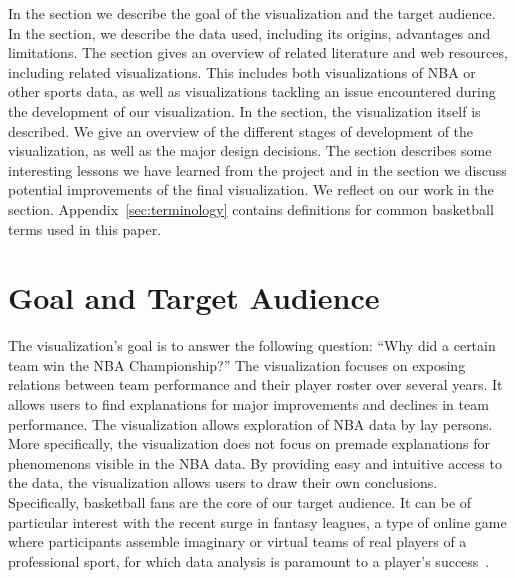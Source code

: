 \documentclass[]{sigchi}
\begin{document}
In the  section we describe the goal of the visualization and the
target audience. In the  section, we describe the data used, including its origins, advantages and limitations. The  section gives an overview of related literature and web resources, including related
visualizations. This includes both visualizations of NBA or other sports data,
as well as visualizations tackling an issue encountered during the development of
our visualization. In the  section, the visualization itself is described. We give an overview of the different stages of development
of the visualization, as well as the major design decisions.
The  section describes some interesting lessons we have learned from the project and in the  section we discuss potential  improvements of the final visualization. We reflect on our work in the  
 section. Appendix~\ref{sec:terminology} contains definitions 
for common basketball terms used in this paper.

\section{Goal and Target Audience}\label{sec:goal} 
The visualization's goal is to answer the following question:
``Why did a certain team win the NBA Championship?'' The visualization focuses
on exposing relations between team performance and their player roster over
several years. It allows users to find explanations for major improvements and
declines in team performance.  The visualization allows exploration of NBA data
by lay persons.  More specifically, the visualization does not focus on premade
explanations for phenomenons visible in the NBA data. By providing easy and
intuitive access to the data, the visualization allows users to draw their own
conclusions. Specifically,
basketball fans are the core of our target audience. It can be of particular
interest with the recent surge in fantasy leagues, a type of online game where participants assemble imaginary or virtual teams of real players of a professional sport, for which data analysis is
paramount to a player's success~\cite{fantasy,fantasyskill}.
\end{document}
